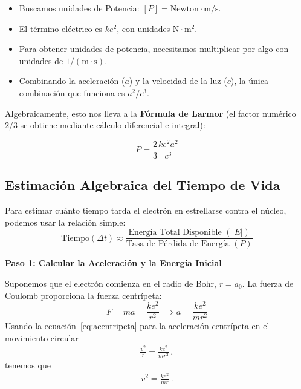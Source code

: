 \documentclass[11pt,a4paper]{book}
\begin{document}
\begin{itemize}
    \item Buscamos unidades de Potencia: $[P] = \text{Newton} \cdot \text{m/s}$.
    \item El término eléctrico es $k e^2$, con unidades $\text{N}\cdot\text{m}^2$.
    \item Para obtener unidades de potencia, necesitamos multiplicar por algo con unidades de $1/(\text{m}\cdot\text{s})$.
    \item Combinando la aceleración ($a$) y la velocidad de la luz ($c$), la única combinación que funciona es $a^2/c^3$.
\end{itemize}

Algebraicamente, esto nos lleva a la \textbf{Fórmula de Larmor} (el factor numérico $2/3$ se obtiene mediante cálculo diferencial e integral):

\begin{equation}
    P = \frac{2}{3} \frac{k e^2 a^2}{c^3}
    \label{eq:larmor}
\end{equation}

\subsection{Estimación Algebraica del Tiempo de Vida}

Para estimar cuánto tiempo tarda el electrón en estrellarse contra el núcleo, podemos usar la relación simple:
\begin{equation}
    \text{Tiempo} (\Delta t) \approx \frac{\text{Energía Total Disponible } (|E|)}{\text{Tasa de Pérdida de Energía } (P)}
\end{equation}

\textbf{Paso 1: Calcular la Aceleración y la Energía Inicial}

Suponemos que el electrón comienza en el radio de Bohr, $r = a_0$. La fuerza de Coulomb proporciona la fuerza centrípeta:
\begin{equation}
    F = m a = \frac{k e^2}{r^2} \implies a = \frac{k e^2}{m r^2}
\end{equation}
Usando la ecuación~\eqref{eq:acentripeta} para la aceleración centrípeta en el movimiento circular
\begin{align*}
    \frac{v^2}{r} = \frac{ke^2}{mr^2}\,,
\end{align*}
tenemos que
\begin{align}
\label{eq:vala2}
    v^2 =\frac{ke^2}{mr}\,.
\end{align}
\end{document}
